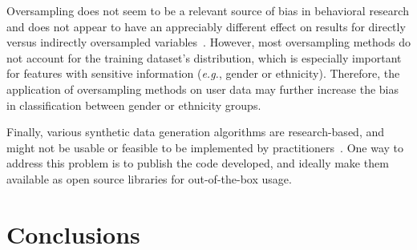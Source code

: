 
Oversampling does not seem to be a relevant source of bias in behavioral
research and does not appear to have an appreciably different effect on
results for directly versus indirectly oversampled
variables~\cite{hauner2014latent}. However, most oversampling methods do not
account for the training dataset's distribution, which is especially important
for features with sensitive information (\textit{e.g.}, gender or ethnicity).
Therefore, the application of oversampling methods on user data may further
increase the bias in classification between gender or ethnicity groups.

Finally, various synthetic data generation algorithms are research-based, and
might not be usable or feasible to be implemented by
practitioners~\cite{bayer2021survey}. One way to address this problem is to
publish the code developed, and ideally make them available as open source
libraries for out-of-the-box usage.



% 

\section{Conclusions}\label{sec:conclusions-synth}

